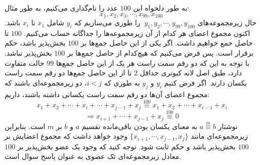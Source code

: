 \p
به طور دلخواه این 
$100$
 عدد را نام‌گذاری می‌کنیم، به طور مثال:
$$x_1, x_2, x_3, \cdots, x_{99}, x_{100}\:$$
 حال زیرمجموعه‌های 
$\:y_1, y_2, \cdots, y_{99}, y_{100}$
 را طوری می‌سازیم که 
$y_i$
 شامل 
$x_1$
 تا
$x_i$
 باشد. اکنون مجموع اعضای هر کدام از آن زیرمجموعه‌ها را جداگانه حساب می‌کنیم.
 $100$
 تا حاصل جمع خواهیم داشت. اگر یکی از این حاصل جمع‌ها بر 
 $100$
 بخش‌پذیر باشد، حکم برقرار است. پس فرض می‌کنیم که هیچ‌کدام از حاصل جمع‌ها بر 
 $100$
 بخش‌پذیر نباشد. با توجه به این که دو رقم سمت راست هر یک از این حاصل جمع‌ها
 $99$
حالت متفاوت دارد، طبق اصل لانه کبوتری حداقل 
$2$
 تا از این  حاصل جمع‌ها دو رقم سمت راست یکسان دارند. اگر فرض کنیم
 $y_i$
 و
 $y_j$
 به طوری که
 $i < j$،
دو زیرمجموعه‌ای باشند که مجموع اعضای آن‌ها دو رقم سمت راست یکسانی داشته باشند، داریم:
  $$x_1 + x_2 + \cdots + x_i + \cdots + x_{j-1} + x_j\overset{100}{\equiv} x_1 + x_2 + \cdots + x_{i-1} + x_i$$
  $$\Rightarrow x_{i+1} + \cdots + x_{j-1} + x_j \overset{100}{\equiv} 0$$
  نوشتار
  $a\overset{m}{\equiv}b$
  به معنای یکسان بودن  باقی‌مانده تقسیم 
  $a$
  و
  $b$
  بر
  $m$
  است.
 \p
 بنابراین زیرمجموعه‌ای مانند
 $\{x_{i+1}, \cdots, x_{j-1}, x_j\}$
 وجود خواهد داشت که مجموع اعضایش بر
 $100$
 بخش‌پذیر باشد و حکم ثابت شود. توجه کنید که وجود یک عضو بخش‌پذیر بر
$100$ 
معادل زیرمجموعه‌ای تک عضوی به عنوان پاسخ سوال است.
 
 